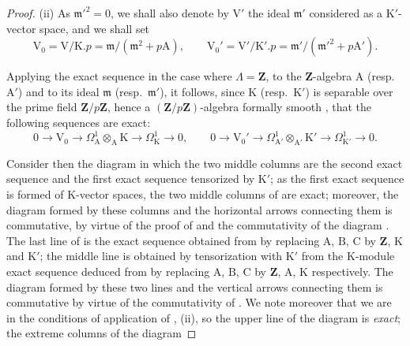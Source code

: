 \begin{proof}
(ii) As $\mathfrak{m}'^2=0$, we shall also denote by $\mathrm{V}'$ the ideal $\mathfrak{m}'$ considered as a $\mathrm{K}'$-vector space, and we shall set
\begin{equation}
\label{0.22.4.4.4}
  \mathrm{V}_0=\mathrm{V}/\mathrm{K}.p=\mathfrak{m}/(\mathfrak{m}^2+p\mathrm{A}),\qquad
  \mathrm{V}_0'=\mathrm{V}'/\mathrm{K}'.p=\mathfrak{m}'/(\mathfrak{m}'^2+p\mathrm{A}').
  \tag{22.4.4.4}
\end{equation}

Applying the exact sequence  in the case where $\Lambda=\mathbf{Z}$, to the $\mathbf{Z}$-algebra $\mathrm{A}$ (resp.~$\mathrm{A}'$) and to its ideal $\mathfrak{m}$ (resp.~$\mathfrak{m}'$), it follows, since $\mathrm{K}$ (resp.~$\mathrm{K}'$) is separable over the prime field $\mathbf{Z}/p\mathbf{Z}$, hence a $(\mathbf{Z}/p\mathbf{Z})$-algebra formally smooth , that the following sequences are exact:
\begin{equation}
\label{0.22.4.4.5}
  0\longrightarrow\mathrm{V}_0\longrightarrow\Omega^1_\mathrm{A}\otimes_\mathrm{A}\mathrm{K}
  \longrightarrow\Omega^1_\mathrm{K}\longrightarrow0,\qquad
  0\longrightarrow\mathrm{V}_0'\longrightarrow\Omega^1_{\mathrm{A}'}\otimes_{\mathrm{A}'}\mathrm{K}'
  \longrightarrow\Omega^1_{\mathrm{K}'}\longrightarrow0.
  \tag{22.4.4.5}
\end{equation}

Consider then the diagram  in which the two middle columns are the second exact sequence  and the first exact sequence  tensorized by $\mathrm{K}'$; as the first exact sequence  is formed of $\mathrm{K}$-vector spaces, the two middle columns of  are exact; moreover, the diagram formed by these columns and the horizontal arrows connecting them is commutative, by virtue of the proof of  and the commutativity of the diagram .
The last line of  is the exact sequence obtained from  by replacing $\mathrm{A}$, $\mathrm{B}$, $\mathrm{C}$ by $\mathbf{Z}$, $\mathrm{K}$ and $\mathrm{K}'$; the middle line is obtained by tensorization with $\mathrm{K}'$ from the $\mathrm{K}$-module exact sequence deduced from  by replacing $\mathrm{A}$, $\mathrm{B}$, $\mathrm{C}$ by $\mathbf{Z}$, $\mathrm{A}$, $\mathrm{K}$ respectively.
The diagram formed by these two lines and the vertical arrows connecting them is commutative by virtue of the commutativity of .
We note moreover that we are in the conditions of application of , (ii), so the upper line of the diagram  is \emph{exact}; the extreme columns of the diagram


\end{proof}
